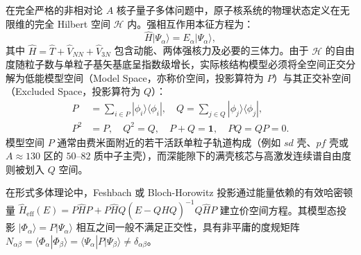 在完全严格的非相对论 $A$ 核子量子多体问题中，原子核系统的物理状态定义在无限维的完全 Hilbert 空间 $\mathcal{H}$ 内。强相互作用本征方程为：
\begin{equation}\label{eq:2-7-full-schrodinger}
\hat{H} |\Psi_\alpha\rangle = E_\alpha |\Psi_\alpha\rangle,
\end{equation}
其中 $\hat{H} = \hat{T} + \hat{V}_{NN} + \hat{V}_{3N}$ 包含动能、两体强核力及必要的三体力。由于 $\mathcal{H}$ 的自由度随粒子数与单粒子基矢基底呈指数级增长，实际核结构模型必须将全空间正交分解为低能模型空间（Model Space，亦称价空间，投影算符为 $P$）与其正交补空间（Excluded Space，投影算符为 $Q$）：
\begin{equation}\label{eq:2-7-PQ-projectors}
\begin{aligned}
P &= \sum_{i \in P} |\phi_i\rangle \langle \phi_i|, \quad Q = \sum_{j \in Q} |\phi_j\rangle \langle \phi_j|, \\
P^2 &= P, \quad Q^2 = Q, \quad P + Q = \mathbf{1}, \quad PQ = QP = 0.
\end{aligned}
\end{equation}
模型空间 $P$ 通常由费米面附近的若干活跃单粒子轨道构成（例如 $sd$ 壳、$pf$ 壳或 $A\approx 130$ 区的 $50\text{--}82$ 质中子主壳），而深能隙下的满壳核芯与高激发连续谱自由度则被划入 $Q$ 空间。

在形式多体理论中，Feshbach 或 Bloch-Horowitz 投影通过能量依赖的有效哈密顿量 $\hat{H}_{\mathrm{eff}}(E) = P\hat{H}P + P\hat{H}Q(E - Q\hat{H}Q)^{-1}Q\hat{H}P$ 建立价空间方程。其模型态投影 $|\Phi_\alpha\rangle = P|\Psi_\alpha\rangle$ 相互之间一般不满足正交性，具有非平庸的度规矩阵 $N_{\alpha\beta} = \langle \Phi_\alpha | \Phi_\beta \rangle = \langle \Psi_\alpha | P | \Psi_\beta \rangle \ne \delta_{\alpha\beta}$。

